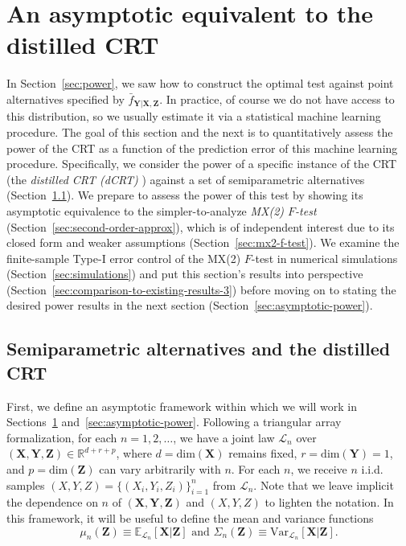 \documentclass[ejs]{imsart}
\numberwithin{equation}{section}
\theoremstyle{plain}
\theoremstyle{definition}
\theoremstyle{remark}
\newcommand{\prx}{\bm X}
\newcommand{\srx}{X}
\newcommand{\prz}{\bm Z}
\newcommand{\srz}{Z}
\newcommand{\pry}{{\bm Y}}
\newcommand{\sry}{Y}
\begin{document}
\section{An asymptotic equivalent to the distilled CRT} \label{sec:weakening}

In Section~\ref{sec:power}, we saw how to construct the optimal test against point alternatives specified by $\bar f_{\pry|\prx,\prz}$. In practice, of course we do not have access to this distribution, so we usually estimate it via a statistical machine learning procedure. The goal of this section and the next is to quantitatively assess the power of the CRT as a function of the prediction error of this machine learning procedure. Specifically, we consider  the power of a specific instance of the CRT (the \textit{distilled CRT (dCRT)} \cite{Liu2020})  against a set of semiparametric alternatives (Section~\ref{sec:asymptotic-setup}). We prepare to assess the power of this test by showing its asymptotic equivalence to the simpler-to-analyze \textit{MX(2) $F$-test} (Section~\ref{sec:second-order-approx}), which is of independent interest due to its closed form and weaker assumptions (Section~\ref{sec:mx2-f-test}). We examine the finite-sample Type-I error control of the MX(2) $F$-test in numerical simulations (Section~\ref{sec:simulations}) and put this section's results into perspective (Section~\ref{sec:comparison-to-existing-results-3}) before moving on to stating the desired power results in the next section (Section~\ref{sec:asymptotic-power}).


\subsection{Semiparametric alternatives and the distilled CRT} \label{sec:asymptotic-setup}

First, we define an asymptotic framework within which we will work in Sections~\ref{sec:weakening} and~\ref{sec:asymptotic-power}. Following a triangular array formalization, for each $n = 1, 2, \dots$, we have a joint law $\mathcal L_n$ over $(\prx, \pry, \prz) \in \mathbb R^{d + r + p}$, where $d = \text{dim}(\prx)$ remains fixed, $r = \text{dim}(\pry) = 1$, and $p = \text{dim}(\prz)$ can vary arbitrarily with $n$. For each $n$, we receive $n$ i.i.d. samples $(\srx, \sry, \srz) = \{(\srx_i, \sry_i, \srz_i)\}_{i = 1}^n$ from $\mathcal L_n$. Note that we leave implicit the dependence on $n$ of $(\prx,\pry,\prz)$ and $(X,Y,Z)$ to lighten the notation. In this framework, it will be useful to define the mean and variance functions
\begin{equation}
	\mu_n(\prz) \equiv \mathbb E_{\mathcal L_n}[\prx|\prz]  \text{ and } \Sigma_n(\prz) \equiv \text{Var}_{\mathcal L_n}[\prx|\prz].
	\label{eq:conditional-mean-variance}
\end{equation}
\end{document}
